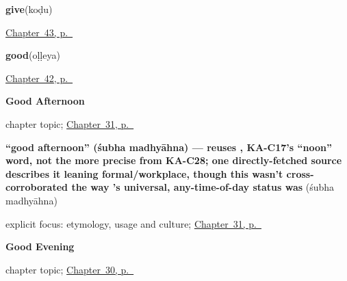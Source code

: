 \noindent\begin{minipage}[t]{\linewidth}
\raggedright
\textbf{give}\enspace\emph{}\enspace(koḍu)\par
\footnotesize \hyperref[ch:ka-more-verbs]{Chapter~43, p.~\pageref*{ch:ka-more-verbs}}
\end{minipage}\par\smallskip

\noindent\begin{minipage}[t]{\linewidth}
\raggedright
\textbf{good}\enspace\emph{}\enspace(oḷḷeya)\par
\footnotesize \hyperref[ch:kn-describing-things]{Chapter~42, p.~\pageref*{ch:kn-describing-things}}
\end{minipage}\par\smallskip

\noindent\begin{minipage}[t]{\linewidth}
\raggedright
\textbf{Good Afternoon}\par
\footnotesize chapter topic; \hyperref[ch:ka-good-afternoon]{Chapter~31, p.~\pageref*{ch:ka-good-afternoon}}
\end{minipage}\par\smallskip

\noindent\begin{minipage}[t]{\linewidth}
\raggedright
\textbf{\textquotedblleft{}good afternoon\textquotedblright{} (śubha madhyāhna) — reuses , KA-C17's \textquotedblleft{}noon\textquotedblright{} word, not the more precise  from KA-C28; one directly-fetched source describes it leaning formal/workplace, though this wasn't cross-corroborated the way 's universal, any-time-of-day status was}\enspace\emph{ }\enspace(śubha madhyāhna)\par
\footnotesize explicit focus: etymology, usage and culture; \hyperref[ch:ka-good-afternoon]{Chapter~31, p.~\pageref*{ch:ka-good-afternoon}}
\end{minipage}\par\smallskip

\noindent\begin{minipage}[t]{\linewidth}
\raggedright
\textbf{Good Evening}\par
\footnotesize chapter topic; \hyperref[ch:ka-good-evening]{Chapter~30, p.~\pageref*{ch:ka-good-evening}}
\end{minipage}\par\smallskip

